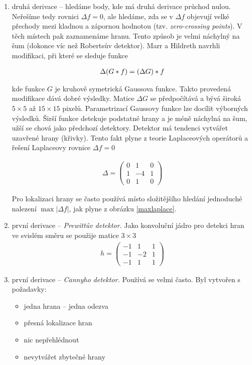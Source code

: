 \begin{enumerate}
\item druhá derivace -- hledáme body, kde má druhá derivace průchod nulou. Neřešíme tedy rovnici $\Delta f=0$, ale hledáme,
zda se v $\Delta f$ objevují velké přechody mezi kladnou a zápornou hodnotou (tzv. {\em zero-crossing points}). V těch 
místech pak zaznamenáme hranu. Tento způsob je velmi náchylný na šum (dokonce víc než Robertsův detektor). Marr a Hildreth
navrhli modifikaci, při které se sleduje funkce

\begin{eqnarray}
\Delta (G\ast f)=(\Delta G)\ast f
\end{eqnarray}

kde funkce $G$ je kruhově symetrická Gaussova funkce. Takto provedená modifikace dává dobré výsledky. Matice $\Delta G$ 
se předpočítává a bývá široká $5\times5$ až $15\times15$ pixelů. Parametrizací Gaussovy funkce lze docílit výborných 
výsledků. Širší funkce detekuje podstatné hrany a je méně náchylná na šum, užší se chová jako předchozí detektory.
Detektor má tendenci vytvářet uzavřené hrany (křivky). Tento fakt plyne z teorie Laplaceových operátorů a řešení
Laplaceovy rovnice $\Delta f=0$

\begin{eqnarray}
\Delta =\left(\begin{array}{ccc}0&1&0\\1&-4&1\\0&1&0\end{array}\right)
\end{eqnarray}

Pro lokalizaci hrany se často používá místo složitějšího hledání  jednoduché nalezení $\max|\Delta f|$, 
jak plyne z obrázku \ref{maxlaplace}.
\item první derivace -- {\em Prewittův detektor.}
Jako konvoluční jádro pro detekci hran ve svislém směru  se použije matice $3\times3$
\begin{eqnarray}
h =\left(\begin{array}{ccc}-1&1&1\\-1&-2&1\\-1&1&1\end{array}\right)
\end{eqnarray}

\item první derivace -- {\em Cannyho detektor.} Používá se velmi často. Byl vytvořen s požadavky:
\begin{itemize} 
\item jedna hrana -- jedna odezva
\item přesná lokalizace hran
\item nic nepřehlédnout
\item nevytvářet zbytečné hrany
\end{itemize}


\end{enumerate}
